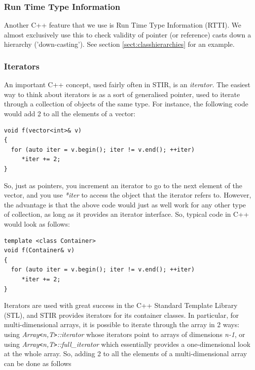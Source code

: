 \documentclass{article}
\begin{document}
\subsubsection{Run Time Type Information}
Another C++ feature that we use is Run Time Type 
Information (RTTI). We almost exclusively use this to check validity 
of pointer (or reference) casts down a hierarchy ('down-casting'). 
See section \ref{sect:classhierarchies} 
for an example.

\subsubsection{
Iterators}

An important C++ concept, used fairly often in STIR, is an \textit{iterator.} The 
easiest way to think about iterators is as a sort of generalised 
pointer, used to iterate through a collection of objects of the 
same type. For instance, the following code would add 2 to all 
the elements of a vector:

\begin{verbatim}
void f(vector<int>& v)
{
  for (auto iter = v.begin(); iter != v.end(); ++iter)
     *iter += 2;
}
\end{verbatim}


So, just as pointers, you increment an iterator to go to the 
next element of the vector, and you use \textit{*iter} to access the 
object that the iterator refers to. However, the advantage is 
that the above code would just as well work for any other type 
of collection, as long as it provides an iterator interface. 
So, typical code in C++ would look as follows:

\begin{verbatim}
template <class Container>
void f(Container& v)
{
  for (auto iter = v.begin(); iter != v.end(); ++iter)
     *iter += 2;
}
\end{verbatim}


Iterators are used with great success in the C++ Standard Template 
Library (STL), and STIR provides iterators for its container 
classes. In particular, for multi-dimensional arrays, it is possible 
to iterate through the array in 2 ways: using \textit{Array\texttt{<}n,T\texttt{>}::iterator} 
whose iterators point to arrays of dimensions \textit{n-1}, or using \textit{Array\texttt{<}n,T\texttt{>}::full\_iterator} which 
essentially provides a one-dimensional look at the whole array. 
So, adding 2 to all the elements of a multi-dimensional array 
can be done as follows
\end{document}
